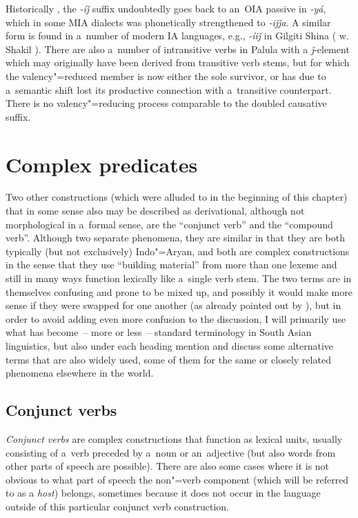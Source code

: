 Historically \citep[316--317]{masica1991}, the \textit{-íǰ} suffix undoubtedly goes back to an~OIA passive in \textit{-yá}, which in some MIA dialects was phonetically strengthened to \textit{-iǰǰa}. A similar form is found in a~number of modern IA languages, e.g., \textit{-íiǰ} in Gilgiti Shina (\citeauthor{radloffshakil1998} w. Shakil \citeyear[116]{radloffshakil1998}). There are also a~number of intransitive verbs in Palula with a \textit{ǰ}-element which may originally have been derived from transitive verb stems, but for which the valency"=reduced member is now either the sole survivor, or has due to a~semantic shift lost its productive connection with a~transitive counterpart. There is no valency"=reducing process comparable to the doubled causative suffix.


\section{Complex predicates}
\label{sec:8-6}


Two other constructions (which were alluded to in the beginning of this chapter) that in some sense also may be described as derivational, although not morphological in a~formal sense, are the ``conjunct verb'' and the ``compound verb''. Although two separate phenomena, they are similar in that they are both typically (but not exclusively) Indo"=Aryan, and both are complex constructions in the sense that they use ``building material'' from more than one lexeme and still in many ways function lexically like a~single verb stem. The two terms are in themselves confusing and prone to be mixed up, and possibly it would make more sense if they were swapped for one another (as already pointed out by \citealt[326]{masica1991}), but in order to avoid adding even more confusion to the discussion, I will primarily use what has become~-- more or less~-- standard terminology in South Asian linguistics, but also under each heading mention and discuss some alternative terms that are also widely used, some of them for the same or closely related phenomena elsewhere in the world.


\subsection{Conjunct verbs}
\label{subsec:8-6-1}

\textit{Conjunct verbs} are complex constructions that function as lexical units, usually consisting of a~verb preceded by a~noun or an~adjective (but also words from other parts of speech are possible). There are also some cases where it is not obvious to what part of speech the non"=verb component (which will be referred to as a \textit{host}) belongs, sometimes because it does not occur in the language outside of this particular conjunct verb construction. 



